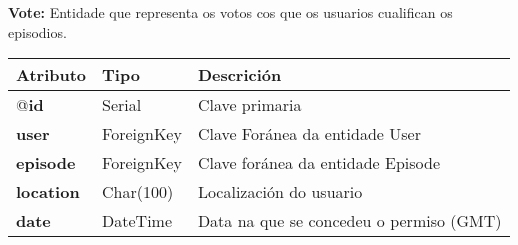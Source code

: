 \textbf{Vote:}  Entidade que representa os votos cos que os usuarios cualifican os episodios.

\begin{longtable}{|p{3cm}|p{3cm}|p{8cm}|}
	\hline
	\rowcolor{gray!50}
	Atributo & Tipo & Descrición\\
	\hline
	@\textbf{id} & Serial & Clave primaria\\
	\hline
	\textbf{user} & ForeignKey & Clave Foránea da entidade User\\
	\hline
	\textbf{episode} & ForeignKey & Clave foránea da entidade Episode\\
	\hline
	\textbf{location} & Char(100) & Localización do usuario\\
	\hline
	\textbf{date} & DateTime & Data na que se concedeu o permiso (GMT)\\
	\hline
\end{longtable}

